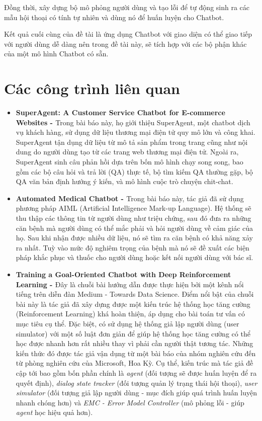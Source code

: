 Đồng thời, xây dựng bộ mô phỏng người dùng và tạo lỗi để tự động sinh ra các mẫu hội thoại có tính tự nhiên và dùng nó để huấn luyện cho Chatbot.

Kết quả cuối cùng của đề tài là ứng dụng Chatbot với giao diện có thể giao tiếp với người dùng dễ dàng nên trong đề tài này, sẽ tích hợp với các bộ phận khác của một mô hình Chatbot có sẵn.

\section{Các công trình liên quan}
\begin{itemize}
    \item \textbf{SuperAgent: A Customer Service Chatbot for E-commerce Websites - \cite{superagent}} Trong bài báo này, họ giới thiệu SuperAgent, một chatbot dịch vụ khách hàng, sử dụng dữ liệu thương mại điện tử quy mô lớn và công khai. SuperAgent tận dụng dữ liệu từ mô tả sản phẩm trong trang cũng như nội dung do người dùng tạo từ các trang web thương mại điện tử. Ngoài ra, SuperAgent sinh câu phản hồi dựa trên bốn mô hình chạy song song, bao gồm các bộ câu hỏi và trả lời (QA) thực tế, bộ tìm kiếm QA thường gặp, bộ QA văn bản định hướng ý kiến, và mô hình cuộc trò chuyện chit-chat.
    \item \textbf{Automated Medical Chatbot - \cite{automatedmedical}} Trong bài báo này, tác giả đã sử dụng phương pháp AIML (Artificial Intelligence Mark-up Language). Hệ thống sẽ thu thập các thông tin từ người dùng như triệu chứng, sau đó đưa ra những căn bệnh mà người dùng có thể mắc phải và hỏi người dùng về cảm giác của họ. Sau khi nhận được nhiều dữ liệu, nó sẽ tìm ra căn bệnh có khả năng xảy ra nhất. Tuỳ vào mức độ nghiêm trọng của bệnh mà nó sẽ đề xuất các biện pháp khắc phục và thuốc cho người dùng hoặc kết nối người dùng với bác sĩ.
    \item \textbf{Training a Goal-Oriented Chatbot with Deep Reinforcement Learning - \cite{traininggochatbot}} Đây là chuỗi bài hướng dẫn được thực hiện bởi một kênh nổi tiếng trên diễn đàn Medium - Towards Data Science. Điểm nổi bật của chuỗi bài này là tác giả đã xây dựng được một kiến trúc hệ thống học tăng cường (Reinforcement Learning) khá hoàn thiện, áp dụng cho bài toán tư vấn có mục tiêu cụ thể. Đặc biệt, có sử dụng hệ thống giả lập người dùng (user simulator) với một số luật đơn giản để giúp hệ thống học tăng cường có thể học được nhanh hơn rất nhiều thay vì phải cần người thật tương tác. Những kiến thức đó được tác giả vận dụng từ một bài báo \cite{endtoend} của nhóm nghiên cứu đến từ phòng nghiên cứu của Microsoft, Hoa Kỳ. Cụ thể, kiến trúc mà tác giả đề cập tới bao gồm bốn phần chính là \textit{agent} (đối tượng sẽ được huấn luyện để ra quyết định), \textit{dialog state tracker} (đối tượng quản lý trạng thái hội thoại), \textit{user simulator} (đối tượng giả lập người dùng - mục đích giúp quá trình huấn luyện nhanh chóng hơn) và \textit{EMC - Error Model Controller} (mô phỏng lỗi - giúp \textit{agent} học hiệu quả hơn).
\end{itemize}

